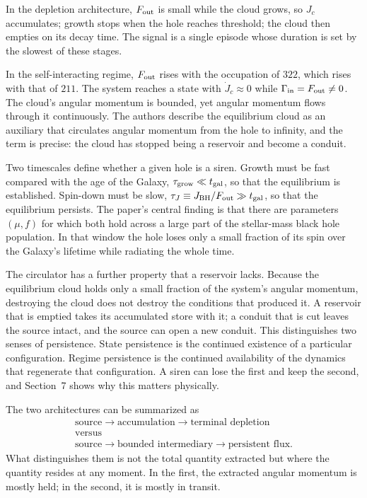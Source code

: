 \documentclass[11pt]{article}
\begin{document}
In the depletion architecture, $F_{\rm out}$ is small while the cloud grows, so $J_{c}$ accumulates; growth stops when the hole reaches threshold; the cloud then empties on its decay time. The signal is a single episode whose duration is set by the slowest of these stages.

In the self-interacting regime, $F_{\rm out}$ rises with the occupation of $322$, which rises with that of $211$. The system reaches a state with $\dot J_{c} \approx 0$ while $\Gamma_{\rm in} = F_{\rm out} \neq 0$. The cloud's angular momentum is bounded, yet angular momentum flows through it continuously. The authors describe the equilibrium cloud as an auxiliary that circulates angular momentum from the hole to infinity, and the term is precise: the cloud has stopped being a reservoir and become a conduit.

Two timescales define whether a given hole is a siren. Growth must be fast compared with the age of the Galaxy, $\tau_{\rm grow} \ll t_{\rm gal}$, so that the equilibrium is established. Spin-down must be slow, $\tau_{J} \equiv J_{\rm BH}/F_{\rm out} \gg t_{\rm gal}$, so that the equilibrium persists. The paper's central finding is that there are parameters $(\mu, f)$ for which both hold across a large part of the stellar-mass black hole population. In that window the hole loses only a small fraction of its spin over the Galaxy's lifetime while radiating the whole time.

The circulator has a further property that a reservoir lacks. Because the equilibrium cloud holds only a small fraction of the system's angular momentum, destroying the cloud does not destroy the conditions that produced it. A reservoir that is emptied takes its accumulated store with it; a conduit that is cut leaves the source intact, and the source can open a new conduit. This distinguishes two senses of persistence. State persistence is the continued existence of a particular configuration. Regime persistence is the continued availability of the dynamics that regenerate that configuration. A siren can lose the first and keep the second, and Section~7 shows why this matters physically.

The two architectures can be summarized as
\begin{gather*}
\text{source} \rightarrow \text{accumulation} \rightarrow \text{terminal depletion}\\
\text{versus}\\
\text{source} \rightarrow \text{bounded intermediary} \rightarrow \text{persistent flux}.
\end{gather*}
What distinguishes them is not the total quantity extracted but where the quantity resides at any moment. In the first, the extracted angular momentum is mostly held; in the second, it is mostly in transit.
\end{document}
